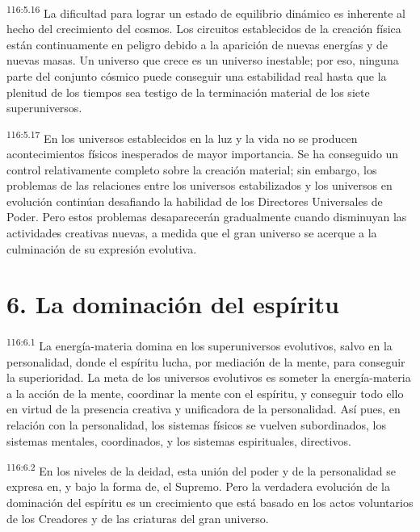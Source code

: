 \documentclass[twoside, 11pt]{book}
\begin{document}
\par
\textsuperscript{116:5.16} La dificultad para lograr un estado de equilibrio dinámico es inherente al hecho del crecimiento del cosmos. Los circuitos establecidos de la creación física están continuamente en peligro debido a la aparición de nuevas energías y de nuevas masas. Un universo que crece es un universo inestable; por eso, ninguna parte del conjunto cósmico puede conseguir una estabilidad real hasta que la plenitud de los tiempos sea testigo de la terminación material de los siete superuniversos.

\par
\textsuperscript{116:5.17} En los universos establecidos en la luz y la vida no se producen acontecimientos físicos inesperados de mayor importancia. Se ha conseguido un control relativamente completo sobre la creación material; sin embargo, los problemas de las relaciones entre los universos estabilizados y los universos en evolución continúan desafiando la habilidad de los Directores Universales de Poder. Pero estos problemas desaparecerán gradualmente cuando disminuyan las actividades creativas nuevas, a medida que el gran universo se acerque a la culminación de su expresión evolutiva.

\section*{6. La dominación del espíritu}
\par
\textsuperscript{116:6.1} La energía-materia domina en los superuniversos evolutivos, salvo en la personalidad, donde el espíritu lucha, por mediación de la mente, para conseguir la superioridad. La meta de los universos evolutivos es someter la energía-materia a la acción de la mente, coordinar la mente con el espíritu, y conseguir todo ello en virtud de la presencia creativa y unificadora de la personalidad. Así pues, en relación con la personalidad, los sistemas físicos se vuelven subordinados, los sistemas mentales, coordinados, y los sistemas espirituales, directivos.

\par
\textsuperscript{116:6.2} En los niveles de la deidad, esta unión del poder y de la personalidad se expresa en, y bajo la forma de, el Supremo. Pero la verdadera evolución de la dominación del espíritu es un crecimiento que está basado en los actos voluntarios de los Creadores y de las criaturas del gran universo.
\end{document}
